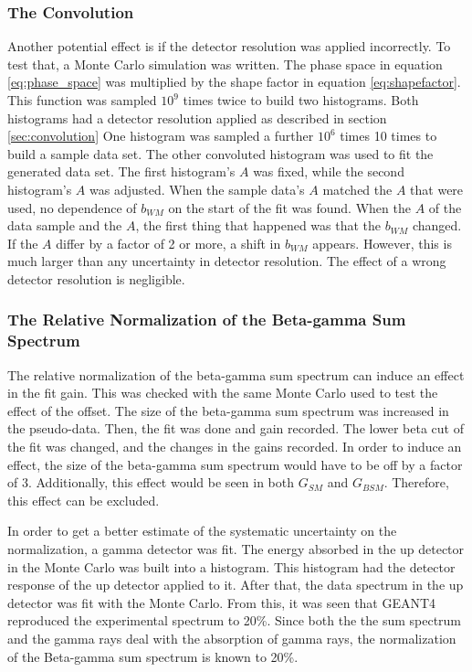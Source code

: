 \documentclass[../MaxHughesThesis.tex]{subfiles}
\begin{document}
\subsubsection{The Convolution}

Another potential effect is if the detector resolution was applied incorrectly.
To test that, a Monte Carlo simulation was written.
The phase space in equation \ref{eq:phase_space} was multiplied by the shape factor in equation \ref{eq:shapefactor}.
This function was sampled $10^{9}$ times twice to build two histograms. 
Both histograms had a detector resolution applied as described in section \ref{sec:convolution}
One histogram was sampled a further $10^{6}$ times 10 times to build a sample data set.
The other convoluted histogram was used to fit the generated data set.
The first histogram's $A$ was fixed, while the second histogram's $A$ was adjusted.
When the sample data's $A$ matched the $A$ that were used, no dependence of $b_{WM}$ on the start of the fit was found.
When the $A$ of the data sample and the $A$, the first thing that happened was that the $b_{WM}$ changed.
If the $A$ differ by a factor of 2 or more, a shift in $b_{WM}$ appears.
However, this is much larger than any uncertainty in detector resolution.
The effect of a wrong detector resolution is negligible. 

\subsubsection{The Relative Normalization of the Beta-gamma Sum Spectrum}

The relative normalization of the beta-gamma sum spectrum can induce an effect in the fit gain.
This was checked with the same Monte Carlo used to test the effect of the offset.
The size of the beta-gamma sum spectrum was increased in the pseudo-data.
Then, the fit was done and gain recorded.
The lower beta cut of the fit was changed, and the changes in the gains recorded.
In order to induce an effect, the size of the beta-gamma sum spectrum would have to be off by a factor of 3.
Additionally, this effect would be seen in both $G_{SM}$ and $G_{BSM}$. 
Therefore, this effect can be excluded.

In order to get a better estimate of the systematic uncertainty on the normalization, a gamma detector was fit.
The energy absorbed in the up detector in the Monte Carlo was built into a histogram.
This histogram had the detector response of the up detector applied to it.
After that, the data spectrum in the up detector was fit with the Monte Carlo.
From this, it was seen that GEANT4 reproduced the experimental spectrum to 20\%.
Since both the the sum spectrum and the gamma rays deal with the absorption of gamma rays, the normalization of the Beta-gamma sum spectrum is known to 20\%.    
\end{document}
